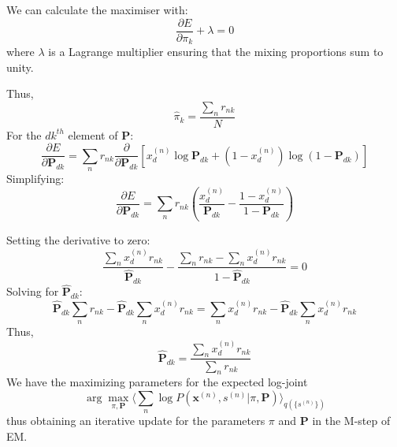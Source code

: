 \documentclass[12pt]{article}
\begin{document}
\begin{enumerate}
{We can calculate the maximiser with:
$$\frac{\partial E}{\partial \pi_k} + \lambda = 0$$
where $\lambda$ is a Lagrange multiplier ensuring that the mixing proportions sum to unity.

Thus,
$$\hat \pi_k = \frac{\sum_{n}r_{nk}}{N}$$
For the $dk^{th}$ element of $\mathbf{P}$:
$$\frac{\partial E}{\partial \mathbf{P}_{dk}} = \sum_n r_{nk}\frac{\partial}{\partial \mathbf{P}_{dk}}[x^{(n)}_{d}\log \mathbf{P}_{dk}+(1-x^{(n)}_{d}) \log(1-\mathbf{P}_{dk})]$$
Simplifying:
$$\frac{\partial E}{\partial \mathbf{P}_{dk}} = \sum_n r_{nk}(\frac{x^{(n)}_{d}}{ \mathbf{P}_{dk}}-\frac{1-x^{(n)}_{d}}{1-\mathbf{P}_{dk}})$$

Setting the derivative to zero:
$$\frac{\sum_n  x^{(n)}_{d}r_{nk}}{\hat{\mathbf{P}}_{dk}}-\frac{\sum_n r_{nk}-\sum_n  x^{(n)}_{d}r_{nk}}{1-\hat{\mathbf{P}}_{dk}} = 0$$
Solving for $\hat{\mathbf{P}}_{dk}$:
$$\hat{\mathbf{P}}_{dk}\sum_n r_{nk}-\hat{\mathbf{P}}_{dk}\sum_n x^{(n)}_{d}r_{nk} = \sum_n  x^{(n)}_{d}r_{nk}-\hat{\mathbf{P}}_{dk}\sum_n  x^{(n)}_{d}r_{nk}$$
Thus,
$$\hat{\mathbf{P}}_{dk} = \frac{\sum_n x^{(n)}_{d}r_{nk}}{\sum_n r_{nk}}$$
We have the maximizing parameters for the expected log-joint
$$\arg \max_{\pi, \mathbf{P}} \Bigg\langle \sum_n \log P(\textbf{x}^{(n)}, s^{(n)}| \pi, \mathbf{P})\Bigg\rangle_{q(\{s^{(n)}\})}$$
thus obtaining an iterative update for the parameters $\pi$ and $\mathbf{P}$ in the M-step of EM.

}
\end{enumerate}
\end{document}
